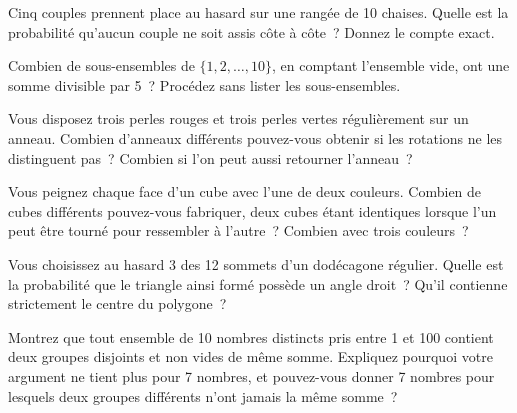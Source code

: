 \begin{question}\label{iq:iv1:counting-and-symmetry:28}
Cinq couples prennent place au hasard sur une rangée de 10 chaises. Quelle est la probabilité qu'aucun couple ne soit assis côte à côte~? Donnez le compte exact.
\end{question}

\begin{question}\label{iq:iv1:counting-and-symmetry:29}
Combien de sous-ensembles de $\{1, 2, \dots, 10\}$, en comptant l'ensemble vide, ont une somme divisible par 5~? Procédez sans lister les sous-ensembles.
\end{question}

\begin{question}\label{iq:iv1:counting-and-symmetry:30}
Vous disposez trois perles rouges et trois perles vertes régulièrement sur un anneau. Combien d'anneaux différents pouvez-vous obtenir si les rotations ne les distinguent pas~? Combien si l'on peut aussi retourner l'anneau~?
\end{question}

\begin{question}\label{iq:iv1:counting-and-symmetry:31}
Vous peignez chaque face d'un cube avec l'une de deux couleurs. Combien de cubes différents pouvez-vous fabriquer, deux cubes étant identiques lorsque l'un peut être tourné pour ressembler à l'autre~? Combien avec trois couleurs~?
\end{question}

\begin{question}\label{iq:iv1:counting-and-symmetry:32}
Vous choisissez au hasard 3 des 12 sommets d'un dodécagone régulier. Quelle est la probabilité que le triangle ainsi formé possède un angle droit~? Qu'il contienne strictement le centre du polygone~?
\end{question}

\begin{question}\label{iq:iv1:counting-and-symmetry:33}
Montrez que tout ensemble de 10 nombres distincts pris entre 1 et 100 contient deux groupes disjoints et non vides de même somme. Expliquez pourquoi votre argument ne tient plus pour 7 nombres, et pouvez-vous donner 7 nombres pour lesquels deux groupes différents n'ont jamais la même somme~?
\end{question}

